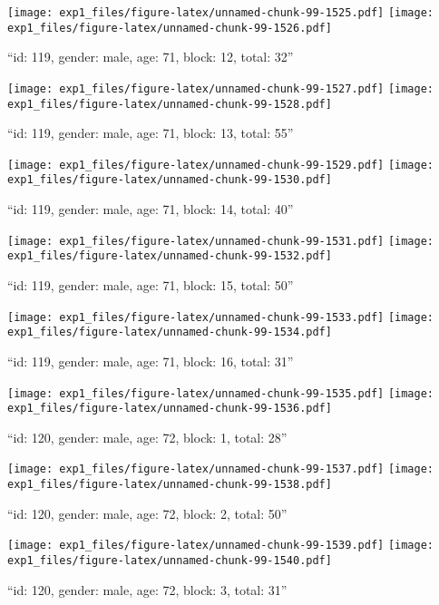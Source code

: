 \documentclass[,]{article}
\begin{document}
\texttt{[image: exp1\_files/figure-latex/unnamed-chunk-99-1525.pdf]}
\texttt{[image: exp1\_files/figure-latex/unnamed-chunk-99-1526.pdf]}

\newpage
[1] 

``id: 119, gender: male, age: 71, block: 12, total: 32''

\texttt{[image: exp1\_files/figure-latex/unnamed-chunk-99-1527.pdf]}
\texttt{[image: exp1\_files/figure-latex/unnamed-chunk-99-1528.pdf]}

\newpage
[1] 

``id: 119, gender: male, age: 71, block: 13, total: 55''

\texttt{[image: exp1\_files/figure-latex/unnamed-chunk-99-1529.pdf]}
\texttt{[image: exp1\_files/figure-latex/unnamed-chunk-99-1530.pdf]}

\newpage
[1] 

``id: 119, gender: male, age: 71, block: 14, total: 40''

\texttt{[image: exp1\_files/figure-latex/unnamed-chunk-99-1531.pdf]}
\texttt{[image: exp1\_files/figure-latex/unnamed-chunk-99-1532.pdf]}

\newpage
[1] 

``id: 119, gender: male, age: 71, block: 15, total: 50''

\texttt{[image: exp1\_files/figure-latex/unnamed-chunk-99-1533.pdf]}
\texttt{[image: exp1\_files/figure-latex/unnamed-chunk-99-1534.pdf]}

\newpage
[1] 

``id: 119, gender: male, age: 71, block: 16, total: 31''

\texttt{[image: exp1\_files/figure-latex/unnamed-chunk-99-1535.pdf]}
\texttt{[image: exp1\_files/figure-latex/unnamed-chunk-99-1536.pdf]}

\newpage
[1] 

``id: 120, gender: male, age: 72, block: 1, total: 28''

\texttt{[image: exp1\_files/figure-latex/unnamed-chunk-99-1537.pdf]}
\texttt{[image: exp1\_files/figure-latex/unnamed-chunk-99-1538.pdf]}

\newpage
[1] 

``id: 120, gender: male, age: 72, block: 2, total: 50''

\texttt{[image: exp1\_files/figure-latex/unnamed-chunk-99-1539.pdf]}
\texttt{[image: exp1\_files/figure-latex/unnamed-chunk-99-1540.pdf]}

\newpage
[1] 

``id: 120, gender: male, age: 72, block: 3, total: 31''
\end{document}
